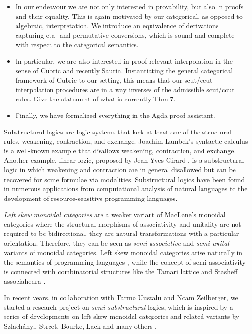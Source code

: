 \documentclass[sn-mathphys-num]{sn-jnl}%
\theoremstyle{thmstyleone}%
\theoremstyle{thmstyletwo}%
\theoremstyle{thmstylethree}%
\begin{document}
{\begin{itemize}
  \item In our endeavour we are not only interested in provability, but also in proofs and their equality. This is again motivated by our categorical, as opposed to algebraic, interpretation. We introduce an equivalence of derivations capturing eta- and permutative conversions, which is sound and complete with respect to the categorical semantics.
  \item In particular, we are also interested in proof-relevant interpolation in the sense of Cubric and recently Saurin. Instantiating the general categorical framework of Cubric to our setting, this means that our scut/ccut-interpolation procedures are in a way inverses of the admissible scut/ccut rules. Give the statement of what is currently Thm 7.
  \item Finally, we have formalized everything in the Agda proof assistant.
  \end{itemize}
}


Substructural logics are logic systems that lack at least one of the structural rules, weakening, contraction, and exchange.
Joachim Lambek's syntactic calculus \cite{lambek:mathematics:58} is a well-known example that disallows weakening, contraction, and exchange.
Another example, linear logic, proposed by Jean-Yves Girard \cite{girard:linear:87}, is a substructural logic in which weakening and contraction are in general disallowed but can be recovered for some formulae via modalities.
Substructural logics have been found in numerous applications from computational analysis of natural languages to the development of resource-sensitive programming languages.


\emph{Left skew monoidal categories} \cite{szlachanyi:skew-monoidal:2012} are a weaker variant of MacLane's monoidal categories where the structural morphisms of associativity and unitality are not required to be bidirectional, they are natural transformations with a particular orientation.
Therefore, they can be seen as \emph{semi-associative} and \emph{semi-unital} variants of monoidal categories. 
Left skew monoidal categories arise naturally in the semantics of programming languages \cite{altenkirch:monads:2014}, while the concept of semi-associativity is connected with combinatorial structures like the Tamari lattice and Stasheff associahedra \cite{zeilberger:semiassociative:19}.

In recent years, in collaboration with Tarmo Uustalu and Noam Zeilberger, we started a research project on \emph{semi-substructural} logics, which is inspired by a series of developments on left skew monoidal categories and related variants by Szlach{\'a}nyi, Street, Bourke, Lack and many others \cite{szlachanyi:skew-monoidal:2012,street:skew-closed:2013,lack:triangulations:2014,bourke:skew:2018,bourke:lack:braided:2020}.
\end{document}
